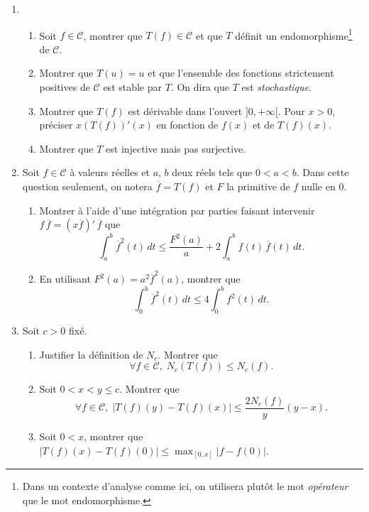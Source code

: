 \begin{enumerate}
 \item 
\begin{enumerate}
 \item  Soit $f\in \mathcal{C}$, montrer que $T(f)\in \mathcal{C}$ et que $T$ définit un endomorphisme\footnote{Dans un contexte d'analyse comme ici, on utilisera plutôt le mot \emph{opérateur} que le mot endomorphisme.} de $\mathcal{C}$.
 \item Montrer que $T(u)=u$ et que l'ensemble des fonctions strictement positives de $\mathcal{C}$ est stable par $T$. On dira que $T$ est \emph{stochastique}.
 \item Montrer que $T(f)$ est dérivable dans l'ouvert $]0,+\infty[$. Pour $x>0$, préciser $x(T(f))'(x)$ en fonction de $f(x)$ et de $T(f)(x)$. 
 \item Montrer que $T$ est injective mais pas surjective.
\end{enumerate}

\item Soit $f\in \mathcal{C}$ à valeurs réelles et $a$, $b$ deux réels tels que $0<a<b$. Dans cette question seulement, on notera $\overline{f}=T(f)$ et $F$ la primitive de $f$ nulle en $0$.
\begin{enumerate}
 \item Montrer à l'aide d'une intégration par parties faisant intervenir $f\,\overline{f} = (x\overline{f})'\,\overline{f}$ que 
\begin{displaymath}
 \int_a^b \overline{f}^2(t)\,dt \leq \frac{F^2(a)}{a} + 2\int_a^b f(t)\,\overline{f}(t)\, dt.
\end{displaymath}
\item En utilisant $F^2(a) = a^2 \overline{f}^2(a)$, montrer que 
\begin{displaymath}
 \int_0^b \overline{f}^2(t)\,dt \leq 4 \int_0^b f^2(t)\,dt .
\end{displaymath}
\end{enumerate}

 \item Soit $c>0$ fixé.
\begin{enumerate}
 \item \label{borne} Justifier la définition de $N_c$. Montrer que 
\[
 \forall f\in \mathcal{C}, \; N_c(T(f)) \leq N_c(f).
\]
 \item Soit $0<x<y \leq c$. Montrer que 
\begin{displaymath}
 \forall f\in \mathcal{C}, \; \left|T(f)(y) - T(f)(x)\right|\leq \frac{2 N_c(f)}{y}(y-x).
\end{displaymath}
 \item Soit $0<x$, montrer que $\left|T(f)(x) - T(f)(0)\right|\leq \max_{[0,x]}|f - f(0)|$.
\end{enumerate}
 

\end{enumerate}
